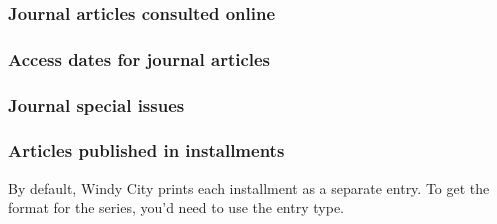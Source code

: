 \documentclass[11pt,letterpaper,oneside]{article}
\begin{document}
\begin{citebib}
\item \cite{gold2015}
\item \cite[2--3]{paudyal2015}
\end{citebib}

\subsubsection{Journal articles consulted online}

\begin{citebib}
\item \cite[268]{whitney1929}
\item \cite[260--61]{schoenfield2016}
\end{citebib}

\subsubsection{Access dates for journal articles}

\begin{citebib}
\item \cite[81]{narr2015}
\item \cite[88--89]{narr2015}
\end{citebib}

\setcounter{subsubsection}{177}
\subsubsection{Journal special issues}

\begin{citebib}
\item \cite{tezuka2013}
\end{citebib}

\setcounter{subsubsection}{179}
\subsubsection{Articles published in installments}

By default, Windy City prints each installment as a separate entry. To
get the format for the series, you'd need to use the 
entry type.

\begin{citebib}
\item \cite[312]{brown1978}
\end{citebib}
\end{document}
